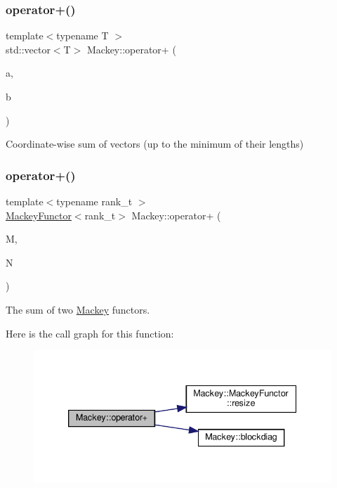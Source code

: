 \subsubsection{\texorpdfstring{operator+()}{operator+()}\hspace{0.1cm}{\footnotesize\ttfamily [2/3]}}
{\footnotesize\ttfamily template$<$typename T $>$ \\
std\+::vector$<$T$>$ Mackey\+::operator+ (\begin{DoxyParamCaption}\item[{const std\+::vector$<$ T $>$ \&}]{a,  }\item[{const std\+::vector$<$ T $>$ \&}]{b }\end{DoxyParamCaption})}



Coordinate-\/wise sum of vectors (up to the minimum of their lengths) 

\mbox{\label{namespaceMackey_a738f2b46b7d0c37be203a17083801bbd}} 
\subsubsection{\texorpdfstring{operator+()}{operator+()}\hspace{0.1cm}{\footnotesize\ttfamily [3/3]}}
{\footnotesize\ttfamily template$<$typename rank\+\_\+t $>$ \\
\hyperlink{classMackey_1_1MackeyFunctor}{Mackey\+Functor}$<$rank\+\_\+t$>$ Mackey\+::operator+ (\begin{DoxyParamCaption}\item[{const \hyperlink{classMackey_1_1MackeyFunctor}{Mackey\+Functor}$<$ rank\+\_\+t $>$ \&}]{M,  }\item[{const \hyperlink{classMackey_1_1MackeyFunctor}{Mackey\+Functor}$<$ rank\+\_\+t $>$ \&}]{N }\end{DoxyParamCaption})}



The sum of two \hyperlink{namespaceMackey}{Mackey} functors. 

Here is the call graph for this function\+:\nopagebreak
\begin{figure}[H]
\begin{center}
\leavevmode
\includegraphics[width=339pt]{namespaceMackey_a738f2b46b7d0c37be203a17083801bbd_cgraph}
\end{center}
\end{figure}
\mbox{\label{namespaceMackey_a29199dd05885558a19e305b49ab7b180}} 
